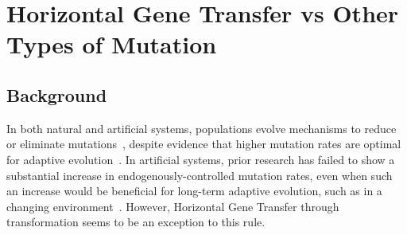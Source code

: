 \documentclass[PhD]{msu-thesis}
\begin{document}

\chapter{Horizontal Gene Transfer vs Other Types of Mutation}
\label{chap:hgt-preferred}
\section{Background}

In both natural and artificial systems, populations evolve mechanisms to reduce or eliminate mutations~\cite{wielgoss_mutation_2013}, despite evidence that higher mutation rates are optimal for adaptive evolution~\cite{clune_natural_2008}.
In artificial systems, prior research has failed to show a substantial increase in endogenously-controlled mutation rates, even when such an increase would be beneficial for long-term adaptive evolution, such as in a changing environment~\cite{clune_natural_2008}.
However, Horizontal Gene Transfer through transformation seems to be an exception to this rule.  
\end{document}
